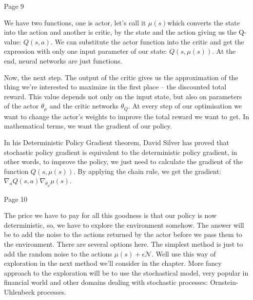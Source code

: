 Page 9

We have two functions, one is actor, let’s call it \begin{math}\mu(s)\end{math}which converts the state
into the action and another is critic, by the state and the action giving us the
Q-value: \begin{math}Q(s, a)\end{math}. We can substitute the actor function into the critic and get
the expression with only one input parameter of our state: \begin{math}Q(s, \mu(s))\end{math}. At the
end, neural networks are just functions.

Now, the next step. The output of the critic gives us the approximation of the
thing we’re interested to maximize in the first place -- the discounted total
reward. This value depends not only on the input state, but also on parameters
of the actor \begin{math}\theta_\mu\end{math} and the critic networks \begin{math}\theta_Q\end{math}. At every step of our optimisation we
want to change the actor’s weights to improve the total reward we want to
get. In mathematical terms, we want the gradient of our policy.

In his Deterministic Policy Gradient theorem, David Silver has proved that
stochastic policy gradient is equivalent to the deterministic policy gradient,
in other words, to improve the policy, we just need to calculate the gradient of
the function \begin{math}Q(s, \mu(s))\end{math}. By applying the chain rule, we
get the gradient: \begin{math}\nabla_aQ(s, a)\nabla_{\theta_{\mu}}\mu(s)\end{math}.


Page 10

The price we have to pay for all this goodness is that our policy is now
deterministic, so, we have to explore the environment somehow. The answer will
be to add the noise to the actions returned by the actor before we pass them to
the environment. There are several options here. The simplest method is just to
add the random noise to the
actions \begin{math}\mu(s)+\epsilon\mathcal{N}\end{math}.
Well use this way of exploration in
the next method we’ll consider in the chapter. More fancy approach to the
exploration will be to use the stochastical model, very popular in financial
world and other domains dealing with stochastic processes: Ornstein-Uhlenbeck
processes.

